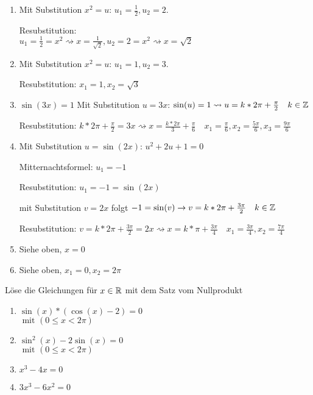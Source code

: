 \begin{lsg}{}
	\begin{enumerate}
    \item Mit Substitution $x^2=u$: $u_1=\frac 1 2, u_2=2$.

		Resubstitution: \\$u_1=\frac 1 2 = x^2 \rightsquigarrow x=\frac 1{\sqrt 2},  u_2=2 = x^2 \rightsquigarrow x=\sqrt 2$
    \item Mit Substitution $x^2=u$: $u_1=1, u_2=3$.

		Resubstitution: $x_1=1, x_2=\sqrt 3$
    \item $\sin(3x) = 1$
		Mit Substitution $u=3x$: $\sin(u)=1 \rightsquigarrow u=k*2\pi+\frac {\pi} 2 \quad k\in\mathbb{Z}$

		Resubstitution: $k*2\pi+\frac {\pi} 2 = 3x \rightsquigarrow x=\frac {k*2\pi} 3+\frac {\pi} 6\quad x_1=\frac \pi 6, x_2=\frac {5\pi} 6, x_3=\frac{9\pi} 6$
    \item Mit Substitution $u=\sin(2x)$: $u^2 + 2u + 1 = 0$

		Mitternachtsformel: $u_1=-1$

		Resubstitution: $u_1=-1=\sin(2x)$

		mit Substitution $v=2x$ folgt $-1=\sin(v) \rightarrow v=k*2\pi+\frac {3\pi} 2 \quad k\in\mathbb{Z}$

		Resubstitution: $v=k*2\pi+\frac {3\pi} 2=2x \rightsquigarrow x=k*\pi+\frac {3\pi} 4 \quad x_1=\frac {3\pi} 4, x_2=\frac {7\pi} 4$
    \item Siehe oben, $x=0$
		\item Siehe oben, $x_1=0,x_2=2\pi$
  \end{enumerate}
\end{lsg}




 Löse die Gleichungen für $x\in \mathbb{R}$ mit dem Satz vom Nullprodukt
\begin{multicols}{3}
  \begin{enumerate}
		\item $\sin(x)*(\cos(x)-2)=0$\\ $\text{ mit }(0\leq x<2\pi)$\columnbreak
		\item $\sin^2(x)-2\sin(x) = 0$\\ $\text{ mit }(0\leq x<2\pi)$\columnbreak
    \item $x^3 - 4x = 0$
    \item $3x^3-6x^2=0$
  \end{enumerate}
\end{multicols}

